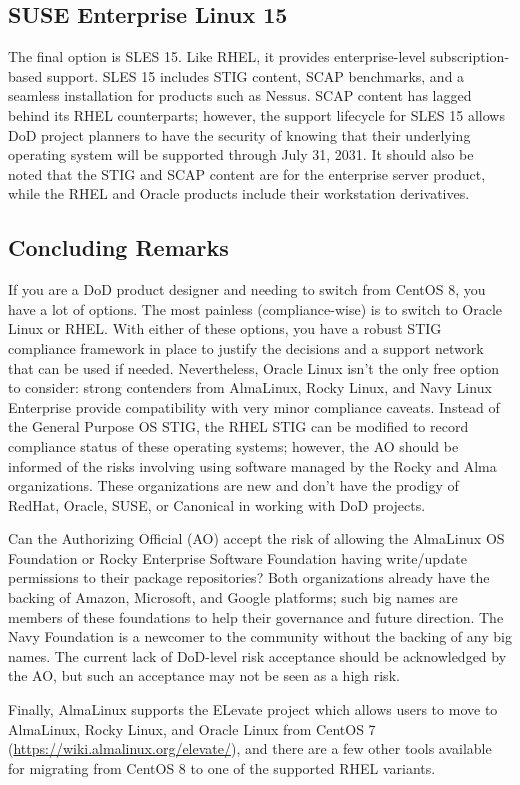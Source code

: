 \subsection{SUSE Enterprise Linux 15}

The final option is SLES 15. Like RHEL, it provides enterprise-level subscription-based support. SLES 15 includes STIG content, SCAP benchmarks, and a seamless installation for products such as Nessus. SCAP content has lagged behind its RHEL counterparts; however, the support lifecycle for SLES 15 allows DoD project planners to have the security of knowing that their underlying operating system will be supported through July 31, 2031. It should also be noted that the STIG and SCAP content are for the enterprise server product, while the RHEL and Oracle products include their workstation derivatives.

\subsection{Concluding Remarks}

If you are a DoD product designer and needing to switch from CentOS 8, you have a lot of options. The most painless (compliance-wise) is to switch to Oracle Linux or RHEL. With either of these options, you have a robust STIG compliance framework in place to justify the decisions and a support network that can be used if needed. Nevertheless, Oracle Linux isn't the only free option to consider: strong contenders from AlmaLinux, Rocky Linux, and Navy Linux Enterprise provide compatibility with very minor compliance caveats. Instead of the General Purpose OS STIG, the RHEL STIG can be modified to record compliance status of these operating systems; however, the AO should be informed of the risks involving using software managed by the Rocky and Alma organizations. These organizations are new and don't have the prodigy of RedHat, Oracle, SUSE, or Canonical in working with DoD projects.

Can the Authorizing Official (AO) accept the risk of allowing the AlmaLinux OS Foundation or Rocky Enterprise Software Foundation having write/update permissions to their package repositories? Both organizations already have the backing of Amazon, Microsoft, and Google platforms; such big names are members of these foundations to help their governance and future direction. The Navy Foundation is a newcomer to the community without the backing of any big names. The current lack of DoD-level risk acceptance should be acknowledged by the AO, but such an acceptance may not be seen as a high risk.

Finally, AlmaLinux supports the ELevate project which allows users to move to AlmaLinux, Rocky Linux, and Oracle Linux from CentOS 7 (\url{https://wiki.almalinux.org/elevate/}), and there are a few other tools available for migrating from CentOS 8 to one of the supported RHEL variants.
